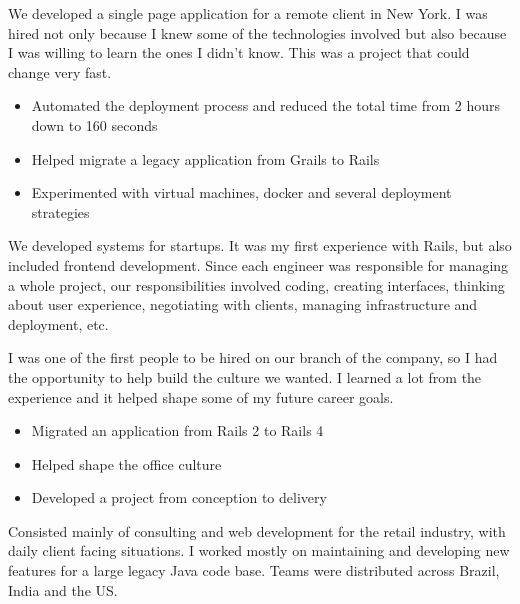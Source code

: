 \documentclass[10pt,a4paper,ragged2e,withhyper]{altacv}
\begin{document}
\begin{paracol}{2}
\divider


{\RaggedRight
We developed a single page application for a remote client in New York. I was hired not only because I knew some of the technologies involved but also because I was willing to learn the ones I didn't know. This was a project that could change very fast.

\begin{itemize}
\item Automated the deployment process and reduced the total time from 2 hours down to 160 seconds
\item Helped migrate a legacy application from Grails to Rails
\item Experimented with virtual machines, docker and several deployment strategies
\end{itemize}
}

\divider


{\RaggedRight
We developed systems for startups. It was my first experience with Rails, but also included frontend development. Since each engineer was responsible for managing a whole project, our responsibilities involved coding, creating interfaces, thinking about user experience, negotiating with clients, managing infrastructure and deployment, etc.

I was one of the first people to be hired on our branch of the company, so I had the opportunity to help build the culture we wanted. I learned a lot from the experience and it helped shape some of my future career goals.

\begin{itemize}
\item Migrated an application from Rails 2 to Rails 4
\item Helped shape the office culture
\item Developed a project from conception to delivery
\end{itemize}
}

\divider


{\RaggedRight
Consisted mainly of consulting and web development for the retail industry, with daily client facing situations. I worked mostly on maintaining and developing new features for a large legacy Java code base. Teams were distributed across Brazil, India and the US.

}
\end{paracol}
\end{document}
